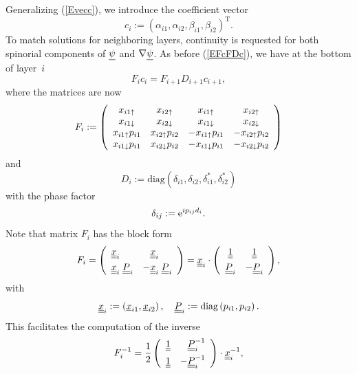 Generalizing (\ref{Evecc}),
we introduce the coefficient vector
\begin{equation}
  c_i := {(\alpha_{i1}, \alpha_{i2}, \beta_{i1}, \beta_{i2})}^\text{T}.
\end{equation}
To match solutions for neighboring layers,
continuity is requested for both spinorial components
of $\underline{\psi}$ and $\mathbf{\nabla}\underline{\psi}$.
As before (\ref{EFcFDc}), we have at the bottom of layer~$i$
\begin{equation}\label{EFcFDcp}
  F_i c_i = F_{i+1} D_{i+1} c_{i+1},
\end{equation}
where the matrices are now
\begin{equation}
  F_i := \left(\begin{array}{cccc}
    x_{i1\uparrow}      &x_{i2\uparrow}     &x_{i1\uparrow}       &x_{i2\uparrow}       \\
    x_{i1\downarrow}      &x_{i2\downarrow}     &x_{i1\downarrow}       &x_{i2\downarrow}       \\
    x_{i1\uparrow}p_{i1}&x_{i2\uparrow}p_{i2}&-x_{i1\uparrow}p_{i1}&-x_{i2\uparrow}p_{i2}\\
    x_{i1\downarrow}p_{i1}&x_{i2\downarrow}p_{i2}&-x_{i1\downarrow}p_{i1}&-x_{i2\downarrow}p_{i2}
  \end{array}\right)
\end{equation}
and
\begin{equation}
  D_i := \text{diag}(\delta_{i1}, \delta_{i2}, \delta_{i1}^*, \delta_{i2}^*)
\end{equation}
with the phase factor
\begin{equation}
   \delta_{ij} := \text{e}^{ip_{ij}d_i}.
\end{equation}
Note that matrix $F_i$ has the block form
\begin{equation}
  F_i
  =\left(\begin{array}{ll}\underline{\underline{x}}_i&\hphantom{-}\underline{\underline{x}}_i\\[1ex]
    \underline{\underline{x}}_i\; \underline{\underline{P}}_i&-\underline{\underline{x}}_i\; \underline{\underline{P}}_i\end{array}\right)
    = \underline{\underline{x}}_i \cdot
    \left(\begin{array}{cc}\underline{\underline{1}}&\underline{\underline{1}}\\[1ex]
    \underline{\underline{P}}_i&-\underline{\underline{P}}_i\end{array}\right),
\end{equation}
with
\begin{equation}
  \underline{\underline{x}}_i :=
  \left(\underline{x}_{i1}, \underline{x}_{i2}\right),
  \quad
  \underline{\underline{P}}_i :=
  \text{diag}\left(p_{i1},p_{i2}\right).
\end{equation}
This facilitates the computation of the inverse
\begin{equation}
  F_i^{-1}
    = \frac{1}{2}
    \left(\begin{array}{cc}\underline{\underline{1}}&\hphantom{-}\underline{\underline{P}}_i^{-1}\\[1.2ex]
      \underline{\underline{1}} &-\underline{\underline{P}}_i^{-1}\end{array}\right)
      \cdot\underline{\underline{x}}_i^{-1},
\end{equation}
